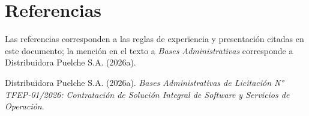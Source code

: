 \documentclass[carta,firma]{lafrox}
\begin{document}
\section*{Referencias}

Las referencias corresponden a las reglas de experiencia y presentación citadas en este documento; la mención en el texto a \textit{Bases Administrativas} corresponde a Distribuidora Puelche S.A. (2026a).

{\setlength{\parindent}{0pt}
\hangindent=1.27cm Distribuidora Puelche S.A. (2026a). \textit{Bases Administrativas de Licitación N° TFEP-01/2026: Contratación de Solución Integral de Software y Servicios de Operación}.\par\medskip

}
\end{document}
